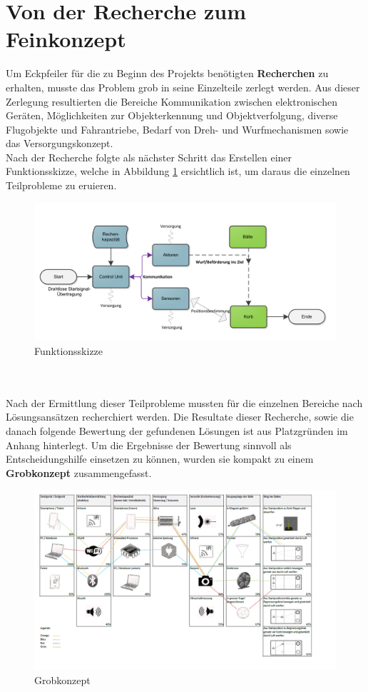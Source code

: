 \section{Von der Recherche zum Feinkonzept}
Um Eckpfeiler für die zu Beginn des Projekts benötigten \textbf{Recherchen} zu erhalten, musste das Problem grob in seine Einzelteile zerlegt werden. Aus dieser Zerlegung resultierten die Bereiche Kommunikation zwischen elektronischen Geräten, Möglichkeiten zur Objekterkennung und Objektverfolgung, diverse Flugobjekte und Fahrantriebe, Bedarf von Dreh- und Wurfmechanismen sowie das Versorgungskonzept. \\
Nach der Recherche folgte als nächster Schritt das Erstellen einer  Funktionsskizze, welche in Abbildung \ref{fig:Funktionsskizze} ersichtlich ist, um daraus die einzelnen Teilprobleme zu eruieren.\\
\begin{figure}[h!]
	\centering
	\includegraphics[width=1\textwidth]{Enddokumentation/Varianten/Bilder/Funktionsskizze.png}
	\caption{Funktionsskizze}
	\label{fig:Funktionsskizze}
\end{figure}
\\\\
Nach der Ermittlung dieser Teilprobleme mussten für die einzelnen Bereiche nach Lösungsansätzen recherchiert werden. Die Resultate dieser Recherche, sowie die danach folgende Bewertung der gefundenen Lösungen ist aus Platzgründen im Anhang hinterlegt. Um die Ergebnisse der Bewertung sinnvoll als Entscheidungshilfe einsetzen zu können, wurden sie kompakt zu einem \textbf{Grobkonzept} zusammengefasst.\\
\begin{figure}[h!]
	\centering
	\includegraphics[width=1\textwidth]{Enddokumentation/Varianten/Bilder/Grobkonzept.png}
	\caption{Grobkonzept}
	\label{fig:Grobkonzept}
\end{figure}
